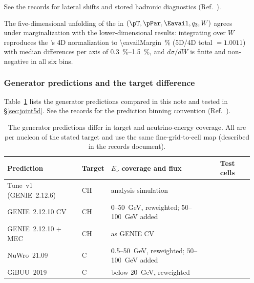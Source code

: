 See the records for lateral shifts and stored hadronic diagnostics (Ref.~\cite{NoteRecords2026}).

The five-dimensional unfolding of the \estPurity{} in $(\pT,\pPar,\Eavail,q_{3},W)$ agrees under marginalization with the lower-dimensional results: integrating over $W$ reproduces the \estPurity{}'s 4D normalization to \SI{\eavailMargin}{\percent} (5D/4D total $=1.0011$) with median differences per axis of \SIrange{0.3}{1.5}{\percent}, and $d\sigma/dW$ is finite and non-negative in all six bins.

\subsubsection{Generator predictions and the target difference}
\label{sec:eavailw-generators}

Table~\ref{tab:generators-impl} lists the generator predictions compared in this note and tested in \S\ref{sec:joint5d}. See the records for the prediction binning convention (Ref.~\cite{NoteRecords2026}).

\begin{table}[htbp]
  \caption[Generator predictions and domains]{The generator predictions differ in target and neutrino-energy coverage. All are per nucleon of the stated target and use the same fine-grid-to-cell map (described in the records document).}
  \label{tab:generators-impl}
  \centering\small
  \begin{tabular}{@{}llll@{}}
    \toprule
    Prediction & Target & $E_{\nu}$ coverage and flux & Test cells \\
    \midrule
    Tune~v1 (GENIE~2.12.6) & CH & analysis simulation & \jtNcells{} \\
    GENIE~2.12.10 CV & CH & 0--\SI{50}{GeV}, reweighted; 50--\SI{100}{GeV} added & \jtNcells{} \\
    GENIE~2.12.10 + MEC & CH & as GENIE CV & \jtNcells{} \\
    NuWro~21.09 & C & 0.5--\SI{50}{GeV}, reweighted; 50--\SI{100}{GeV} added & \jtNcells{} \\
    GiBUU~2019 & C & below \SI{20}{GeV}, reweighted & \jtNcellsGiBUU{} \\
    \bottomrule
  \end{tabular}
\end{table}

